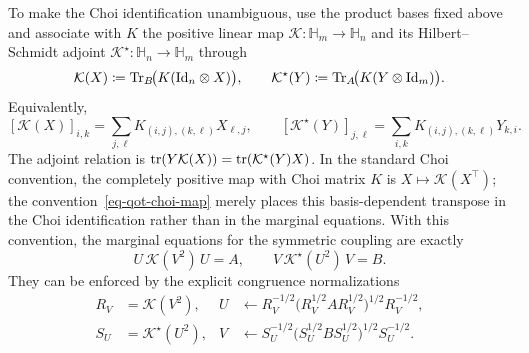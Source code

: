 To make the Choi identification unambiguous, use the product bases fixed above and associate with $K$ the positive linear map $\mathcal K:\mathbb H_m\to\mathbb H_n$ and its Hilbert--Schmidt adjoint $\mathcal K^\star:\mathbb H_n\to\mathbb H_m$ through
\begin{equation}\label{eq-qot-choi-map}
	\mathcal K(X)
	\coloneqq
	\operatorname{Tr}_B\!\bigl(K(\mathrm{Id}_n\otimes X)\bigr),
	\qquad
	\mathcal K^\star(Y)
	\coloneqq
	\operatorname{Tr}_A\!\bigl(K(Y\otimes\mathrm{Id}_m)\bigr).
\end{equation}
Equivalently,
\[
	[\mathcal K(X)]_{i,k}
	=
	\sum_{j,\ell}K_{(i,j),(k,\ell)}X_{\ell,j},
	\qquad
	[\mathcal K^\star(Y)]_{j,\ell}
	=
	\sum_{i,k}K_{(i,j),(k,\ell)}Y_{k,i}.
\]
The adjoint relation is $\operatorname{tr}(Y\mathcal K(X))=\operatorname{tr}(\mathcal K^\star(Y)X)$. In the standard Choi convention, the completely positive map with Choi matrix $K$ is $X\mapsto\mathcal K(X^\top)$; the convention~\eqref{eq-qot-choi-map} merely places this basis-dependent transpose in the Choi identification rather than in the marginal equations. With this convention, the marginal equations for the symmetric coupling are exactly
\[
	U\,\mathcal K(V^2)\,U=A,
	\qquad
	V\,\mathcal K^\star(U^2)\,V=B.
\]
They can be enforced by the explicit congruence normalizations
\begin{equation}\label{eq-qot-gurvits-updates}
\begin{aligned}
	R_V&=\mathcal K(V^2),
	&
	U&\leftarrow
	R_V^{-1/2}\bigl(R_V^{1/2} A R_V^{1/2}\bigr)^{1/2}R_V^{-1/2},
	\\
	S_U&=\mathcal K^\star(U^2),
	&
	V&\leftarrow
	S_U^{-1/2}\bigl(S_U^{1/2} B S_U^{1/2}\bigr)^{1/2}S_U^{-1/2}.
\end{aligned}
\end{equation}
